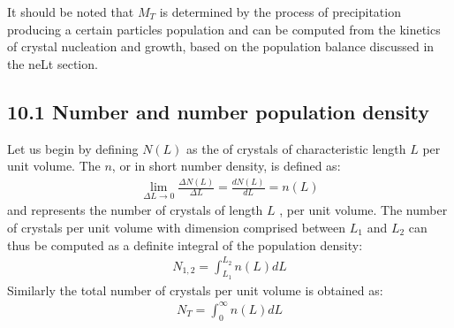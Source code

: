 \documentclass[letterpaper,10pt,english]{jupyterBook}
\begin{document}
\sphinxAtStartPar
It should be noted that \(M_T\) is determined by the process of precipitation producing a certain particles population and can be computed from the kinetics of crystal nucleation and growth, based on the population balance discussed in the neLt section.


\subsection{10.1 Number and number population density}
\label{\detokenize{MSMPR_crystallizer:number-and-number-population-density}}
\sphinxAtStartPar
Let us begin by defining \(N(L)\) as the  of  crystals of characteristic length \(L\) per unit volume.
The  \(n\), or in short number density, is defined as:
\begin{equation}\label{equation:MSMPR_crystallizer:MSMPReq1}
\begin{split}
\lim_{\Delta{L}\to{0}}\frac{\Delta{N(L)}}{\Delta{L}}=\frac{d{N(L)}}{d{L}}=n(L)
\end{split}
\end{equation}
\sphinxAtStartPar
and represents the number of crystals of length \(L\) , per unit volume.
The number of crystals per unit volume with dimension comprised between \(L_1\) and \(L_2\) can thus be computed as a definite integral of the population density:
\begin{equation}\label{equation:MSMPR_crystallizer:MSMPReq2}
\begin{split}
N_{1,2}=\int_{L_1}^{L_2}n(L)dL
\end{split}
\end{equation}
\sphinxAtStartPar
Similarly the total number of crystals per unit volume is obtained as:
\begin{equation}\label{equation:MSMPR_crystallizer:MSMPReq3}
\begin{split}
N_{T}=\int_{0}^{\infty}n(L)dL
\end{split}
\end{equation}
\end{document}
